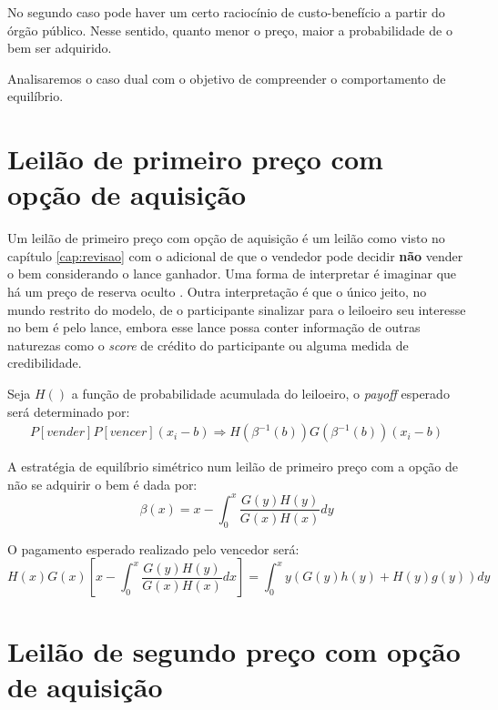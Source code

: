 No segundo caso pode haver um certo raciocínio de custo-benefício a partir do órgão público. Nesse sentido, quanto menor o preço, maior a probabilidade de o bem ser adquirido.

Analisaremos o caso dual com o objetivo de compreender o comportamento de equilíbrio.

\section{Leilão de primeiro preço com opção de aquisição}

Um leilão de primeiro preço com opção de aquisição é um leilão como visto no capítulo \ref{cap:revisao} com o adicional de que o vendedor pode decidir \textbf{não} vender o bem considerando o lance ganhador. Uma forma de interpretar é imaginar que há um preço de reserva oculto \citet{Bugarin2022}. Outra interpretação é que o único jeito, no mundo restrito do modelo, de o participante sinalizar para o leiloeiro seu interesse no bem é pelo lance, embora esse lance possa conter informação de outras naturezas como o \emph{score} de crédito do participante ou alguma medida de credibilidade.

Seja $H()$ a função de probabilidade acumulada do leiloeiro, o \emph{payoff} esperado será determinado por:
\begin{align*}
	P[vender]P[vencer](x_i - b) \Rightarrow H(\beta^{-1}(b))G(\beta^{-1}(b))(x_i - b)
\end{align*}

\begin{proposicao}
	\label{prop:nash-primeiro-preco-opcao}
	A estratégia de equilíbrio simétrico num leilão de primeiro preço com a opção de não se adquirir o bem é dada por:
	\begin{equation}
		\beta(x) = x - \int_0^x \frac{G(y)H(y)}{G(x)H(x)}dy
	\end{equation}
\end{proposicao}

O pagamento esperado realizado pelo vencedor será:
\begin{equation}
	H(x)G(x) \left[ x - \int_0^x \frac{G(y)H(y)}{G(x)H(x)}dx \right] = \int_0^x y(G(y)h(y)+H(y)g(y)) dy
\end{equation}

\section{Leilão de segundo preço com opção de aquisição}

